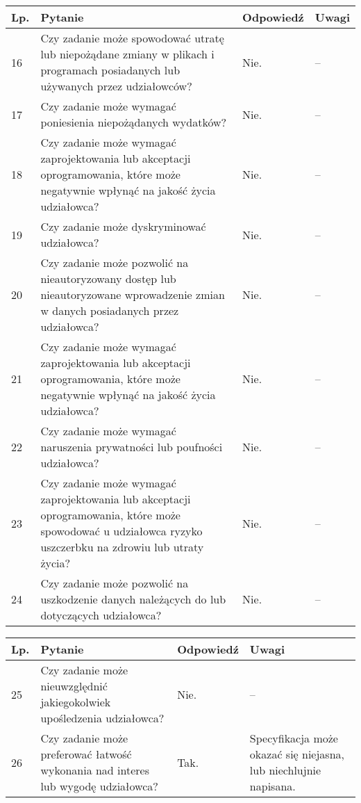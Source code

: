 \documentclass[11pt,oneside,a4paper,titlepage,onecolumn]{article}
\begin{document}
\begin{tabularx}{\textwidth}{|l|X|l|X|}
    \hline
    Lp. & Pytanie & Odpowiedź & Uwagi \\ \hline
    
	16
	& Czy zadanie może spowodować utratę lub niepożądane zmiany w plikach i
    programach posiadanych lub używanych przez udziałowców?
	& Nie.
	& --
	\\\hline
	
	17
	& Czy zadanie może wymagać poniesienia niepożądanych wydatków?
	& Nie.
	& --
	\\\hline
	
	18
	& Czy zadanie może wymagać zaprojektowania lub akceptacji oprogramowania,
    które może negatywnie wpłynąć na jakość życia udziałowca?
	& Nie.
	& --
	\\\hline
	
	19
	& Czy zadanie może dyskryminować udziałowca?
	& Nie.
	& --
	\\\hline
	
	20
	& Czy zadanie może pozwolić na nieautoryzowany dostęp lub nieautoryzowane
    wprowadzenie zmian w danych posiadanych przez udziałowca?
	& Nie.
	& --
	\\\hline
	
	21
	& Czy zadanie może wymagać zaprojektowania lub akceptacji oprogramowania,
    które może negatywnie wpłynąć na jakość życia udziałowca?
	& Nie.
	& --
	\\\hline
	
	22
	& Czy zadanie może wymagać naruszenia prywatności lub poufności udziałowca?
	& Nie.
	& --
	\\\hline
	
	23
	& Czy zadanie może wymagać zaprojektowania lub akceptacji oprogramowania,
    które może spowodować u udziałowca ryzyko uszczerbku na zdrowiu lub utraty
    życia?
	& Nie.
	& --
	\\\hline
	
	24
	& Czy zadanie może pozwolić na uszkodzenie danych należących do lub
    dotyczących udziałowca?
	& Nie.
	& --
	\\\hline
\end{tabularx}

\begin{tabularx}{\textwidth}{|l|X|l|X|}
    \hline
    Lp. & Pytanie & Odpowiedź & Uwagi \\ \hline
    
	25
	& Czy zadanie może nieuwzględnić jakiegokolwiek upośledzenia udziałowca?
	& Nie.
	& --
	\\\hline
    
	26
	& Czy zadanie może preferować łatwość wykonania nad interes lub wygodę
    udziałowca?
	& Tak.
	& Specyfikacja może okazać się niejasna, lub niechlujnie napisana.
	\\\hline
\end{tabularx}
\end{document}
